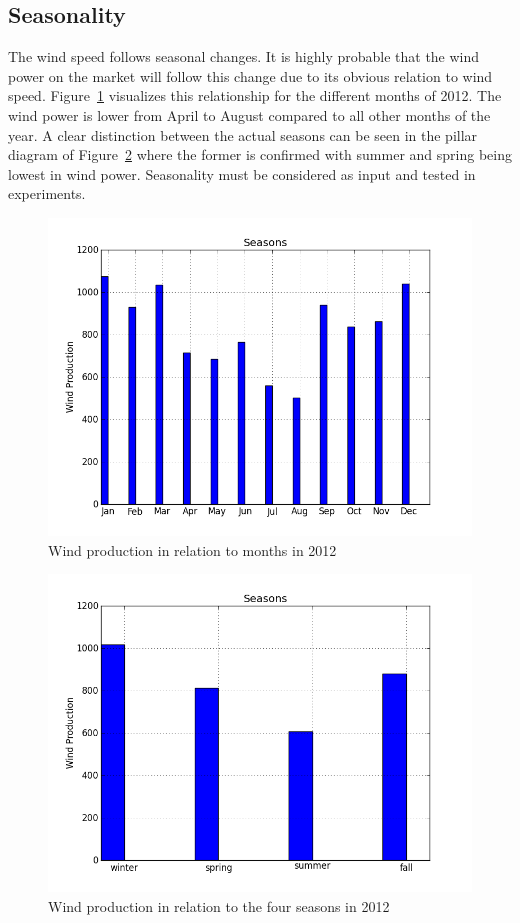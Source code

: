 \subsection{Seasonality}
\label{sec:windProdSeasonality}
The wind speed follows seasonal changes. It is highly probable that the wind power on the market will follow this change due to its obvious relation to wind speed. Figure~\ref{fig:windProductionMonths} visualizes this relationship for the different months of 2012. The wind power is lower from April to August compared to all other months of the year. A clear distinction between the actual seasons can be seen in the pillar diagram of Figure~\ref{fig:windProductionSeasons} where the former is confirmed with summer and spring being lowest in wind power. Seasonality must be considered as input and tested in experiments.

\begin{figure}[H]
\centering
\includegraphics[width=0.85\linewidth]{billeder/Seasons/windProductionMonths.png}
\caption{Wind production in relation to months in 2012}
\label{fig:windProductionMonths}
\end{figure}

\begin{figure}[H]
\centering
\includegraphics[width=0.85\linewidth]{billeder/Seasons/windProdctionSeasons.png}
\caption{Wind production in relation to the four seasons in 2012}
\label{fig:windProductionSeasons}
\end{figure}

